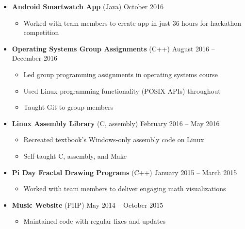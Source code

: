 \documentclass[10pt]{article}
\begin{document}
	\begin{itemize}[noitemsep]
		\item \textbf{Android Smartwatch App} (Java) \hfill October 2016
			\begin{itemize}[noitemsep]
				\item Worked with team members to create app in just 36 hours for hackathon competition
			\end{itemize}
		\item \textbf{Operating Systems Group Assignments} (C++) \hfill August 2016 -- December 2016
			\begin{itemize}[noitemsep]
				\item Led group programming assignments in operating systems course
				\item Used Linux programming functionality (POSIX APIs) throughout
				\item Taught Git to group members
			\end{itemize}
		\item \textbf{Linux Assembly Library} (C, assembly) \hfill February 2016 -- May 2016
			\begin{itemize}[noitemsep]
				\item Recreated textbook's Windows-only assembly code on Linux
				\item Self-taught C, assembly, and Make
			\end{itemize}
		\item \textbf{Pi Day Fractal Drawing Programs} (C++) \hfill January 2015 -- March 2015
			\begin{itemize}[noitemsep]
				\item Worked with team members to deliver engaging math visualizations
			\end{itemize}
		\item \textbf{Music Website} (PHP) \hfill May 2014 -- October 2015
			\begin{itemize}[noitemsep]
				\item Maintained code with regular fixes and updates
			\end{itemize}
	\end{itemize}
\end{document}
